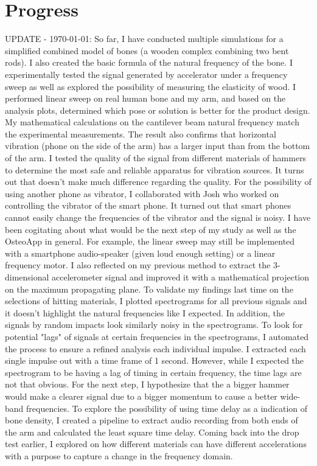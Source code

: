 \documentclass{sigchi}
\begin{document}
\section{Progress} 

UPDATE - \today: So far, I have conducted multiple simulations for a simplified combined model of bones (a wooden complex combining two bent rods). I also created the basic formula of the natural frequency of the bone. I experimentally tested the signal generated by accelerator under a frequency sweep as well as explored the possibility of measuring the elasticity of wood. I performed linear sweep on real human bone and my arm, and based on the analysis plots, determined which pose or solution is better for the product design. My mathematical calculations on the cantilever beam natural frequency match the experimental measurements. The result also confirms that horizontal vibration (phone on the side of the arm) has a larger input than from the bottom of the arm. I tested the quality of the signal from different materials of hammers to determine the most safe and reliable apparatus for vibration sources. It turns out that doesn't make much difference regarding the quality. For the possibility of using another phone as vibrator, I collaborated with Josh who worked on controlling the vibrator of the smart phone. It turned out that smart phones cannot easily change the frequencies of the vibrator and the signal is noisy. I have been cogitating about what would be the next step of my study as well as the OsteoApp in general. For example, the linear sweep may still be implemented with a smartphone audio-speaker (given loud enough setting) or a linear frequency motor. I also reflected on my previous method to extract the 3-dimensional accelerometer signal and improved it with a mathematical projection on the maximum propagating plane. To validate my findings last time on the selections of hitting materials, I plotted spectrograms for all previous signals and it doesn't highlight the natural frequencies like I expected. In addition, the signals by random impacts look similarly noisy in the spectrograms. To look for potential "lags" of signals at certain frequencies in the spectrograms, I automated the process to ensure a refined analysis each individual impulse. I extracted each single impulse out with a time frame of 1 second. However, while I expected the spectrogram to be having a lag of timing in certain frequency, the time lags are not that obvious. For the next step, I hypothesize that the a bigger hammer would make a clearer signal due to a bigger momentum to cause a better wide-band frequencies. To explore the possibility of using time delay as a indication of bone density, I created a pipeline to extract audio recording from both ends of the arm and calculated the least square time delay. Coming back into the drop test earlier, I explored on how different materials can have different accelerations with a purpose to capture a change in the frequency domain. 
\end{document}
